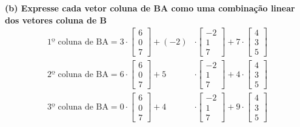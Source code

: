 \documentclass[a4paper,12pt]{article}
\begin{document}
\textbf{(b) Expresse cada vetor coluna de BA como uma combinação linear dos vetores coluna de B}
\begin{align*}
    \text{1º coluna de BA} =
    3 \cdot
    \begin{bmatrix}
        6 \\
        0 \\
        7
    \end{bmatrix}
    + (-2) &\cdot 
    \begin{bmatrix}
        -2 \\
         1 \\
         7
    \end{bmatrix} 
    + 7 \cdot
    \begin{bmatrix}
        4 \\
        3 \\
        5
    \end{bmatrix} \\ 
    \text{2º coluna de BA} =
    6 \cdot
    \begin{bmatrix}
        6 \\
        0 \\
        7
    \end{bmatrix}
    + 5 &\cdot 
    \begin{bmatrix}
        -2 \\
         1 \\
         7
    \end{bmatrix} 
    + 4 \cdot
    \begin{bmatrix}
        4 \\
        3 \\
        5
    \end{bmatrix} \\ 
    \text{3º coluna de BA} =
    0 \cdot
    \begin{bmatrix}
        6 \\
        0 \\
        7
    \end{bmatrix}
    + 4 &\cdot 
    \begin{bmatrix}
        -2 \\
         1 \\
         7
    \end{bmatrix} 
    + 9 \cdot
    \begin{bmatrix}
        4 \\
        3 \\
        5
    \end{bmatrix} \\ 
\end{align*}
\end{document}

